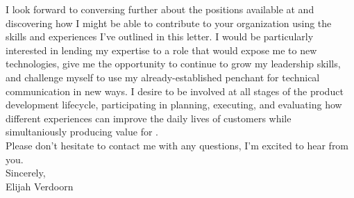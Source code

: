 \noindent I look forward to conversing further about the positions available at \company \space and discovering how I might be able to contribute to your organization using the skills and experiences I've outlined in this letter. I would be particularly interested in lending my expertise to a role that would expose me to new technologies, give me the opportunity to continue to grow my leadership skills, and challenge myself to use my already-established penchant for technical communication in new ways. I desire to be involved at all stages of the product development lifecycle, participating in planning, executing, and evaluating how different experiences can improve the daily lives of customers while simultaniously producing value for \company.\\

\noindent Please don't hesitate to contact me with any questions, I'm excited to hear from you.\\

\noindent Sincerely,
\\\noindent
Elijah Verdoorn

